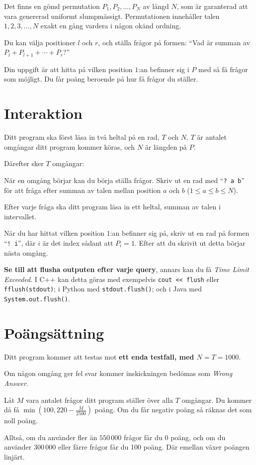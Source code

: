 
Det finns en gömd permutation $P_{1},P_{2},\ldots,P_{N}$ av längd $N$, som är garanterad att vara genererad uniformt slumpmässigt.
Permutationen innehåller talen $1, 2, 3, \ldots, N$ exakt en gång vardera i någon okänd ordning.

Du kan välja positioner $l$ och $r$, och ställa frågor på formen: ``Vad är summan av $P_l + P_{l+1} + \cdots + P_r$?''

Din uppgift är att hitta på vilken position $1$:an befinner sig i $P$ med så få frågor som möjligt.
Du får poäng beroende på hur få frågor du ställer.

\section*{Interaktion}

Ditt program ska först läsa in två heltal på en rad, $T$ och $N$. 
$T$ är antalet omgångar ditt program kommer köras, och $N$ är längden på $P$.

Därefter sker $T$ omgångar:

När en omgång börjar kan du börja ställa frågor. Skriv ut en rad med ``\verb|? a b|'' för
att fråga efter summan av talen mellan position $a$ och $b$ ($1 \leq a \leq b \leq N$).

Efter varje fråga ska ditt program läsa in ett heltal, summan av talen i intervallet.

När du har hittat vilken position $1$:an befinner sig på, skriv ut en rad på formen ``\verb|! i|'',
där $i$ är det index sådant att $P_i = 1$. Efter att du skrivit ut detta börjar nästa omgång.

\textbf{Se till att flusha outputen efter varje query}, annars kan du få \textit{Time Limit Exceeded}.
I C++ kan detta göras med exempelvis \texttt{cout << flush}
eller \texttt{fflush(stdout)};
i Python med \texttt{stdout.flush()};
och i Java med \texttt{System.out.flush()}.

\section*{Poängsättning}

Ditt program kommer att testas mot \textbf{ett enda testfall, med $N = T = 1000$}.

Om någon omgång ger fel svar kommer inskickningen bedömas som \textit{Wrong Answer}.

Låt $M$ vara antalet frågor ditt program ställer över alla $T$ omgångar. Du kommer då få
$\min(100, 220 - \frac{M}{2500})$ poäng. Om du får negativ poäng så räknas det som noll poäng.

Alltså, om du använder fler än $550\,000$ frågor får du 0 poäng, och
om du använder $300\,000$ eller färre frågor får du 100 poäng. Där emellan växer poängen linjärt.
